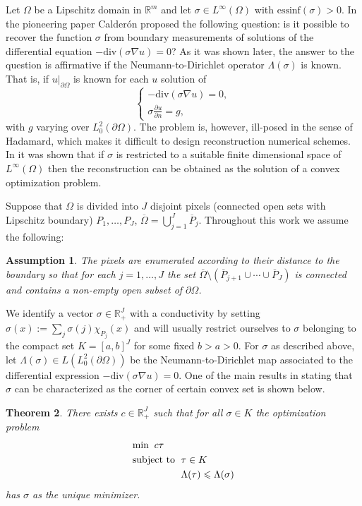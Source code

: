 \documentclass{article}
\newtheorem{theorem}{Theorem}
\newtheorem{assumption}[theorem]{Assumption}
\theoremstyle{definition}
\theoremstyle{remark}
\renewcommand{\leq}{\leqslant}
\begin{document}
Let $\Omega$ be a Lipschitz domain in $\mathbb R^m$ and let $\sigma\in L^\infty(\Omega)$ with $\text{essinf}(\sigma)>0$.
In the pioneering paper \cite{calderonpioneer} Calder\'on proposed the following question: is it possible to recover the function $\sigma$ from boundary measurements of solutions of the differential equation $-\text{div}(\sigma\nabla u)=0$?
As it was shown later, the answer to the question is affirmative if the Neumann-to-Dirichlet operator $\Lambda(\sigma)$ is known.
That is, if $u|_{\partial\Omega}$ is known for each $u$ solution of
\begin{equation}
\begin{cases}
-\text{div}(\sigma\nabla u)=0,\\
\sigma\frac{\partial u}{\partial n} = g,
\end{cases}
\end{equation}
with $g$ varying over $L^2_0(\partial\Omega)$.
The problem is, however, ill-posed in the sense of Hadamard, which makes it difficult to design reconstruction numerical schemes.
In \cite{convexcalderon} it was shown that if $\sigma$ is restricted to a suitable finite dimensional space of $L^\infty(\Omega)$ then the reconstruction can be obtained as the solution of a convex optimization problem.

Suppose that $\Omega$ is divided into $J$ disjoint pixels (connected open sets with Lipschitz boundary) $P_1,\dots,P_J$, $\overline\Omega = \bigcup_{j=1}^J \overline{P}_j$.
Throughout this work we assume the following:
\begin{assumption}\label{as:labeling}
The pixels are enumerated according to their distance to the boundary so that for each $j=1,\dots,J$ the set $\overline\Omega \setminus \left(\overline P_{j+1}\cup\cdots\cup \overline P_J\right)$ is connected and contains a non-empty open subset of $\partial\Omega$.
\end{assumption}
We identify a vector $\sigma\in\mathbb R^J_+$ with a conductivity by setting $\sigma(x) := \sum_j \sigma(j) \chi_{P_j}(x)$ and will usually restrict ourselves to $\sigma$ belonging to the compact set $K = [a,b]^J$ for some fixed $b>a>0$.
For $\sigma$ as described above, let $\Lambda(\sigma) \in L(L_0^2(\partial\Omega))$ be the Neumann-to-Dirichlet map associated to the differential expression $-\text{div}(\sigma\nabla u)=0$.
One of the main results in \cite{convexcalderon} stating that $\sigma$ can be characterized as the corner of certain convex set is shown below.

\begin{theorem}\label{thm:important}
There exists $c\in\mathbb R^J_+$ such that for all $\sigma\in K$ the optimization problem
\begin{align}
& \textup{min}\;\; c\tau \nonumber \\
& \textup{subject to }\; \tau \in K \label{eq:optimization} \\
& \phantom{\textup{subject to }\;} \Lambda(\tau) \leq \Lambda(\sigma) \nonumber
\end{align}
has $\sigma$ as the unique minimizer.
\end{theorem}
\end{document}
